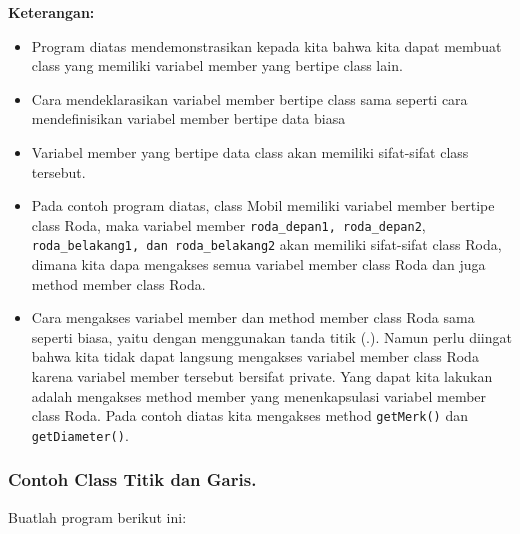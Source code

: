 \textbf{Keterangan:}

\begin{itemize}

\item
  Program diatas mendemonstrasikan kepada kita bahwa kita dapat membuat
  class yang memiliki variabel member yang bertipe class lain.
\item
  Cara mendeklarasikan variabel member bertipe class sama seperti cara
  mendefinisikan variabel member bertipe data biasa
\item
  Variabel member yang bertipe data class akan memiliki sifat-sifat
  class tersebut.
\item
  Pada contoh program diatas, class Mobil memiliki variabel member
  bertipe class Roda, maka variabel member
  \texttt{roda\_depan1,\ roda\_depan2},
  \texttt{roda\_belakang1,\ dan\ roda\_belakang2} akan memiliki
  sifat-sifat class Roda, dimana kita dapa mengakses semua variabel
  member class Roda dan juga method member class Roda.
\item
  Cara mengakses variabel member dan method member class Roda sama
  seperti biasa, yaitu dengan menggunakan tanda titik (.). Namun perlu
  diingat bahwa kita tidak dapat langsung mengakses variabel member
  class Roda karena variabel member tersebut bersifat private. Yang
  dapat kita lakukan adalah mengakses method member yang menenkapsulasi
  variabel member class Roda. Pada contoh diatas kita mengakses method
  \texttt{getMerk()} dan \texttt{getDiameter()}.
\end{itemize}

\subsubsection*{Contoh  Class Titik dan Garis.}

Buatlah program berikut ini:

